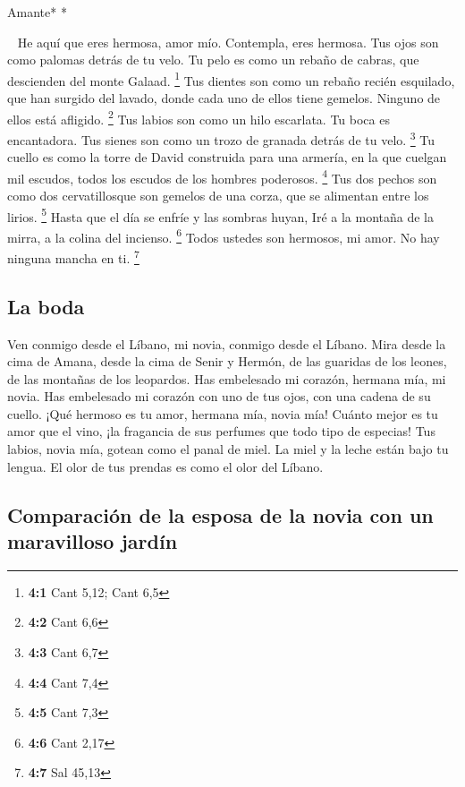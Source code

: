 \begin{paracol}{2}
\emph{\hfill\break
}Amante* *

~ He aquí que eres hermosa, amor mío. Contempla, eres
hermosa. Tus ojos son como palomas detrás de tu velo. Tu pelo es como un
rebaño de cabras, que descienden del monte Galaad. \footnote{\textbf{4:1}
  Cant 5,12; Cant 6,5}  Tus dientes son como un rebaño
recién esquilado, que han surgido del lavado, donde cada uno de ellos
tiene gemelos. Ninguno de ellos está afligido. \footnote{\textbf{4:2}
  Cant 6,6}  Tus labios son como un hilo escarlata. Tu
boca es encantadora. Tus sienes son como un trozo de granada detrás de
tu velo. \footnote{\textbf{4:3} Cant 6,7}  Tu cuello es
como la torre de David construida para una armería, en la que cuelgan
mil escudos, todos los escudos de los hombres poderosos. \footnote{\textbf{4:4}
  Cant 7,4}  Tus dos pechos son como dos cervatillosque
son gemelos de una corza, que se alimentan entre los lirios. \footnote{\textbf{4:5}
  Cant 7,3}  Hasta que el día se enfríe y las sombras
huyan, Iré a la montaña de la mirra, a la colina del incienso.
\footnote{\textbf{4:6} Cant 2,17}  Todos ustedes son
hermosos, mi amor. No hay ninguna mancha en ti. \footnote{\textbf{4:7}
  Sal 45,13}

\hypertarget{la-boda}{%
\subsection{La boda}\label{la-boda}}

 Ven conmigo desde el Líbano, mi novia, conmigo desde el
Líbano. Mira desde la cima de Amana, desde la cima de Senir y Hermón, de
las guaridas de los leones, de las montañas de los leopardos.
 Has embelesado mi corazón, hermana mía, mi novia. Has
embelesado mi corazón con uno de tus ojos, con una cadena de su cuello.
 ¡Qué hermoso es tu amor, hermana mía, novia mía! Cuánto
mejor es tu amor que el vino, ¡la fragancia de sus perfumes que todo
tipo de especias!  Tus labios, novia mía, gotean como el
panal de miel. La miel y la leche están bajo tu lengua. El olor de tus
prendas es como el olor del Líbano.

\hypertarget{comparaciuxf3n-de-la-esposa-de-la-novia-con-un-maravilloso-jarduxedn}{%
\subsection{Comparación de la esposa de la novia con un maravilloso
jardín}\label{comparaciuxf3n-de-la-esposa-de-la-novia-con-un-maravilloso-jarduxedn}}


\end{paracol}
